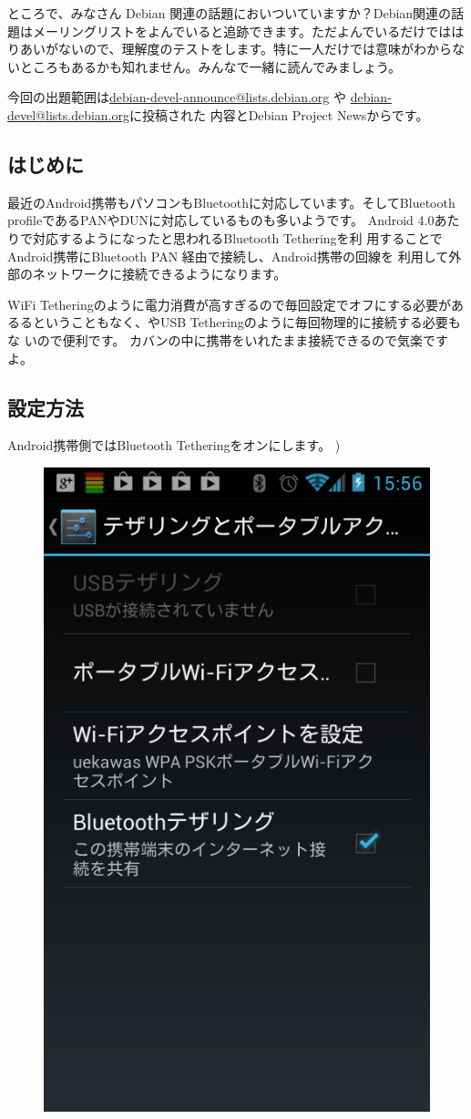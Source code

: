 \documentclass[mingoth,a4paper]{jsarticle}
\begin{document}

ところで、みなさん Debian 関連の話題においついていますか？Debian関連の話
題はメーリングリストをよんでいると追跡できます。ただよんでいるだけではは
りあいがないので、理解度のテストをします。特に一人だけでは意味がわからな
いところもあるかも知れません。みんなで一緒に読んでみましょう。

今回の出題範囲は\url{debian-devel-announce@lists.debian.org} や \url{debian-devel@lists.debian.org}に投稿された
内容とDebian Project Newsからです。

\begin{multicols}{2}

\end{multicols}


\subsection{はじめに}

最近のAndroid携帯もパソコンもBluetoothに対応しています。そしてBluetooth
profileであるPANやDUNに対応しているものも多いようです。
Android 4.0あたりで対応するようになったと思われるBluetooth Tetheringを利
用することでAndroid携帯にBluetooth PAN 経由で接続し、Android携帯の回線を
利用して外部のネットワークに接続できるようになります。

WiFi Tetheringのように電力消費が高すぎるので毎回設定でオフにする必要があ
るるということもなく、やUSB Tetheringのように毎回物理的に接続する必要もな
いので便利です。
カバンの中に携帯をいれたまま接続できるので気楽ですよ。

\subsection{設定方法}

Android携帯側ではBluetooth Tetheringをオンにします。
)

\begin{figure}[H]
 \begin{center}
  \includegraphics[width=0.3\hsize]{image201211/bt-android.png}
  \label{fig:android-bt}
 \end{center}
\end{figure}
\end{document}
